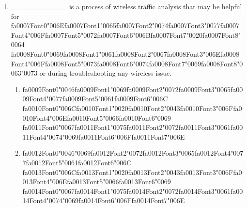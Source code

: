 \documentclass[12pt]{article}
\begin{document}
\begin{enumerate}[label=\arabic*.]
\begin{enumerate}[label=(\alph*)]
    \item {\csname fa0006Font0\endcsname\char"0041}{\csname fa0006Font1\endcsname\char"0045}{\csname fa0006Font2\endcsname\char"0053}
\end{enumerate}
\item \_\_\_\_\_\_\_\_\_\_\_ is a process of wireless traffic analysis that may be helpful for {\csname fa0007Font0\endcsname\char"006E}{\csname fa0007Font1\endcsname\char"0065}{\csname fa0007Font2\endcsname\char"0074}{\csname fa0007Font3\endcsname\char"0077}{\csname fa0007Font4\endcsname\char"006F}{\csname fa0007Font5\endcsname\char"0072}{\csname fa0007Font6\endcsname\char"006B}{\csname fa0007Font7\endcsname\char"0020}{\csname fa0007Font8\endcsname\char"0064} {\csname fa0008Font0\endcsname\char"0069}{\csname fa0008Font1\endcsname\char"0061}{\csname fa0008Font2\endcsname\char"0067}{\csname fa0008Font3\endcsname\char"006E}{\csname fa0008Font4\endcsname\char"006F}{\csname fa0008Font5\endcsname\char"0073}{\csname fa0008Font6\endcsname\char"0074}{\csname fa0008Font7\endcsname\char"0069}{\csname fa0008Font8\endcsname\char"0063}{\char"0073} or during troubleshooting any wireless issue.
\begin{enumerate}[label=(\alph*)]
    \item {\csname fa0009Font0\endcsname\char"0046}{\csname fa0009Font1\endcsname\char"0069}{\csname fa0009Font2\endcsname\char"0072}{\csname fa0009Font3\endcsname\char"0065}{\csname fa0009Font4\endcsname\char"0077}{\csname fa0009Font5\endcsname\char"0061}{\csname fa0009Font6\endcsname\char"006C} {\csname fa0010Font0\endcsname\char"006C}{\csname fa0010Font1\endcsname\char"0020}{\csname fa0010Font2\endcsname\char"0043}{\csname fa0010Font3\endcsname\char"006F}{\csname fa0010Font4\endcsname\char"006E}{\csname fa0010Font5\endcsname\char"0066}{\csname fa0010Font6\endcsname\char"0069} {\csname fa0011Font0\endcsname\char"0067}{\csname fa0011Font1\endcsname\char"0075}{\csname fa0011Font2\endcsname\char"0072}{\csname fa0011Font3\endcsname\char"0061}{\csname fa0011Font4\endcsname\char"0074}{\char"0069}{\csname fa0011Font6\endcsname\char"006F}{\csname fa0011Font7\endcsname\char"006E}
    \item {\csname fa0012Font0\endcsname\char"0046}{\char"0069}{\csname fa0012Font2\endcsname\char"0072}{\csname fa0012Font3\endcsname\char"0065}{\csname fa0012Font4\endcsname\char"0077}{\csname fa0012Font5\endcsname\char"0061}{\csname fa0012Font6\endcsname\char"006C} {\csname fa0013Font0\endcsname\char"006C}{\csname fa0013Font1\endcsname\char"0020}{\csname fa0013Font2\endcsname\char"0043}{\csname fa0013Font3\endcsname\char"006F}{\csname fa0013Font4\endcsname\char"006E}{\csname fa0013Font5\endcsname\char"0066}{\csname fa0013Font6\endcsname\char"0069} {\csname fa0014Font0\endcsname\char"0067}{\csname fa0014Font1\endcsname\char"0075}{\csname fa0014Font2\endcsname\char"0072}{\csname fa0014Font3\endcsname\char"0061}{\csname fa0014Font4\endcsname\char"0074}{\char"0069}{\csname fa0014Font6\endcsname\char"006F}{\csname fa0014Font7\endcsname\char"006E}

\end{enumerate}
\end{enumerate}
\end{document}
